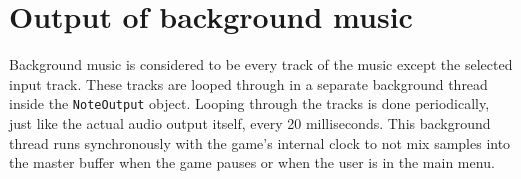 \section{Output of background music}

Background music is considered to be every track of the music except the selected input 
track. These tracks are looped through in a separate background thread inside the {\tt NoteOutput}  
object. Looping through the tracks is done periodically, just like the actual audio 
output itself, every 20 milliseconds. This background thread runs synchronously with the 
game's internal clock to not mix samples into the master buffer when the game pauses or 
when the user is in the main menu. 